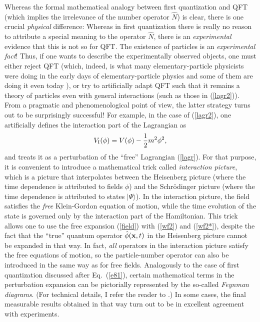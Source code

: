 \documentclass[12pt]{article}
\begin{document}
Whereas the formal mathematical analogy between first quantization and 
QFT (which implies the irrelevance of the number operator $\hat{N}$) 
is clear, 
there is one crucial {\em physical} difference: Whereas in first quantization
there is really no reason to attribute a special meaning 
to the operator $\hat{N}$, there is an {\em experimental} evidence 
that this is not so for QFT. The existence of 
particles is an {\em experimental fact}! Thus, if one wants to describe 
the experimentally observed objects, one must either reject QFT
(which, indeed, is what many elementary-particle physicists were doing 
in the early days of elementary-particle physics and some of them are 
doing it even today \cite{schub}),
or try to artificially adapt QFT such that it 
remains a theory of particles even with general interactions 
(such as those in (\ref{lagr2})). From a pragmatic and phenomenological 
point of view, the latter strategy turns out to be surprisingly 
successful! For example, in the case of (\ref{lagr2}),
one artificially defines the interaction part of the Lagrangian as
\begin{equation}
V_{\rm I}(\phi)=V(\phi)-\frac{1}{2}m^2\phi^2 ,
\end{equation}
and treats it as a perturbation of the ``free'' Lagrangian (\ref{lagr}).
For that purpose, it is convenient to introduce a mathematical trick
called {\em interaction picture}, which is
a picture that interpolates between 
the Heisenberg picture (where the time dependence is attributed 
to fields $\phi$) and the Schr\"odinger picture 
(where the time dependence is
attributed to states $|\Psi\rangle$). In the interaction picture,
the field satisfies the {\em free} Klein-Gordon equation of motion,
while the time evolution of the state is governed only by the interaction 
part of the Hamiltonian. This trick allows one to use
the free expansion (\ref{field}) with (\ref{wf2}) and (\ref{wf2*}), 
despite the fact that the ``true'' quantum operator $\hat{\phi}({\bf x},t)$
in the Heisenberg picture cannot be expanded in that way.
In fact, {\em all} operators in the interaction picture 
satisfy the free equations of motion, so the particle-number operator
can also be introduced in the same way as for free fields.   
Analogously to the case of first quantization discussed after
Eq.~(\ref{e81}), certain mathematical terms in the perturbation expansion 
can be pictorially represented by the so-called {\em Feynman diagrams}.
(For technical details, I refer the reader to \cite{BD2,cheng}.)
In some cases, the final measurable results obtained in that way turn out 
to be in excellent agreement with experiments. 
\end{document}
